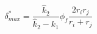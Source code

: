 \documentclass[12pt]{article}
\begin{document}
$$ 
  \delta^*_{max} = \frac{\hat k_2}{\hat k_2 - k_1} \phi_f \frac{2 r_i r_j}{r_i + r_j}
$$
\end{document}
